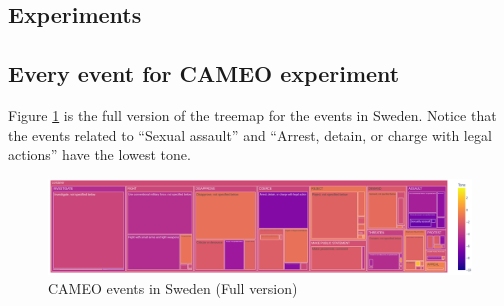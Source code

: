 \documentclass[a4, 11pt]{article}
\begin{document}
\begin{appendices}
\section{Experiments}
\subsection{Every event for CAMEO experiment}

Figure \ref{fig:cameo_full} is the full version of the treemap for the events
in Sweden. Notice that the events related to ``Sexual assault'' and ``Arrest, detain,
or charge with legal actions'' have the lowest tone.

\begin{figure}[ht]
    \centering
    \includegraphics[scale=0.25]{Images/CAMEO_full.png}%
    \caption{CAMEO events in Sweden (Full version)} 
    \label{fig:cameo_full}
\end{figure}

\end{appendices}

\nocite{*}
\printbibliography
\end{document}

